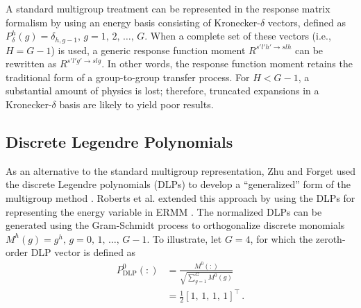\documentclass[5p,times,twocolumn,10pt]{elsarticle}
\begin{document}
    A standard multigroup treatment can be represented in the response matrix 
    formalism by using an energy basis consisting of Kronecker-$\delta$ 
    vectors, defined as $P_{\delta}^h(g) = \delta_{h, g-1},\, g=1,\, 2,\, 
    \ldots,\, G$. When a complete set  of these vectors (i.e., $H = G-1$) is 
    used, a generic response function moment $R^{s'l'h' \to slh}$ can be 
    rewritten as $R^{s'l'g' \to slg}$. In other words, the response function 
    moment retains the traditional form of a
    group-to-group transfer process.  
    For $H < G-1$, a substantial amount of physics is lost; therefore, 
    truncated expansions in a Kronecker-$\delta$ basis are likely to yield poor 
    results.
    
    \subsection{Discrete Legendre Polynomials}
    
    As an alternative to the standard multigroup representation, Zhu and Forget 
    used the discrete Legendre polynomials (DLPs) to develop a ``generalized'' 
    form of the multigroup method \cite{Zhu2011, Zhu2010}. Roberts et al. 
    extended this approach by using the DLPs for representing the energy 
    variable in ERMM \cite{roberts2014psb}. The normalized DLPs can be 
    generated using the Gram-Schmidt process to orthogonalize discrete 
    monomials $M^h(g) =  g^h,\, g=0,\,1,\,\ldots,\, G-1$. To illustrate, let 
    $G=4$, for which the zeroth-order DLP vector is defined as
    \begin{equation}
        \begin{split}
            P_{\text{DLP}}^0(:) &= \frac{M^0(:)}{\sqrt{\sum_{g=1}^{G} M^0(g)}} 
            \\
            &= \frac{1}{2}[1,\,1,\,1,\,1]^{\intercal} \, .
        \end{split}
    \end{equation}
    
\end{document}

